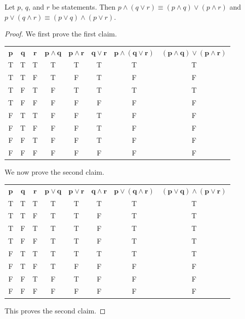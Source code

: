 \begin{proposition}
    Let $p$, $q$, and $r$ be statements. Then $p \land (q \lor r) \equiv (p \land q) \lor (p \land r)$ and $p \lor (q \land r) \equiv (p \lor q) \land (p \lor r)$.
\end{proposition}
\begin{proof}
    We first prove the first claim.
    \begin{table}[H]
        \centering
        \begin{tabular}{|c|c|c||c|c|c||c|c|}
            \hline
            $\boldsymbol{p}$ & $\boldsymbol{q}$ & $\boldsymbol{r}$ & $\boldsymbol{p \land q}$ & $\boldsymbol{p \land r}$ & $\boldsymbol{q \lor r}$ & $\boldsymbol{p \land (q \lor r)}$ & $\boldsymbol{(p \land q) \lor (p \land r)}$ \\ \hhline{|=|=|=#=|=|=#=|=|}
            T & T & T & T & T & T & T & T \\ \hline
            T & T & F & T & F & T & F & F \\ \hline
            T & F & T & F & T & T & T & T \\ \hline
            T & F & F & F & F & F & F & F \\ \hline
            F & T & T & F & F & T & F & F \\ \hline
            F & T & F & F & F & T & F & F \\ \hline
            F & F & T & F & F & T & F & F \\ \hline
            F & F & F & F & F & F & F & F \\ \hline
        \end{tabular}
    \end{table}
    We now prove the second claim.
    \begin{table}[H]
        \centering
        \begin{tabular}{|c|c|c||c|c|c||c|c|}
            \hline
            $\boldsymbol{p}$ & $\boldsymbol{q}$ & $\boldsymbol{r}$ & $\boldsymbol{p \lor q}$ & $\boldsymbol{p \lor r}$ & $\boldsymbol{q \land r}$ & $\boldsymbol{p \lor (q \land r)}$ & $\boldsymbol{(p \lor q) \land (p \lor r)}$ \\ \hhline{|=|=|=#=|=|=#=|=|}
            T & T & T & T & T & T & T & T \\ \hline
            T & T & F & T & T & F & T & T \\ \hline
            T & F & T & T & T & F & T & T \\ \hline
            T & F & F & T & T & F & T & T \\ \hline
            F & T & T & T & T & T & T & T \\ \hline
            F & T & F & T & F & F & F & F \\ \hline
            F & F & T & F & T & F & F & F \\ \hline
            F & F & F & F & F & F & F & F \\ \hline
        \end{tabular}
    \end{table}
    This proves the second claim.
\end{proof}

